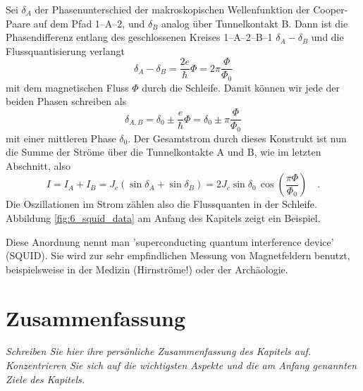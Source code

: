 Sei $\delta_A$ der Phasenunterschied der makroskopischen Wellenfunktion der Cooper-Paare auf dem Pfad 1--A--2, und $\delta_B$ analog über Tunnelkontakt B. Dann ist die Phasendifferenz entlang des geschlossenen Kreises 1--A--2--B--1 $\delta_A - \delta_B$ und die Flussquantisierung verlangt
\begin{equation}
    \delta_A - \delta_B = \frac{2e}{\hbar} \Phi = 2 \pi \frac{\Phi}{\Phi_0}
\end{equation}
mit dem magnetischen Fluss $\Phi$ durch die Schleife. Damit können wir jede der beiden Phasen schreiben als
\begin{equation}
    \delta_{A,B} = \delta_0 \pm  \frac{e}{\hbar} \Phi = \delta_0 \pm \pi \frac{\Phi}{\Phi_0}
\end{equation}
mit einer mittleren Phase $\delta_0$. Der Gesamtstrom durch dieses Konstrukt ist nun die Summe der Ströme über die Tunnelkontakte A und B, wie im letzten Abschnitt, also
\begin{equation}
    I = I_A + I_B = J_c \left( \sin \delta_A +  \sin \delta_B \right) =
     2 J_c \sin \delta_0 \,  \cos \left( \frac{\pi \Phi}{\Phi_0}  \right)  \quad .
\end{equation}
Die Oszillationen im Strom zählen also die Flussquanten in der Schleife.  Abbildung \ref{fig:6_squid_data} am Anfang des Kapitels zeigt ein Beispiel.

Diese Anordnung nennt man 'superconducting quantum interference device' (SQUID). Sie wird zur sehr empfindlichen Messung von Magnetfeldern benutzt, beispielsweise in der Medizin (Hirnströme!) oder der Archäologie.


\newpage

\section{Zusammenfassung}

\textit{Schreiben Sie hier ihre persönliche Zusammenfassung des Kapitels auf. Konzentrieren Sie sich auf die wichtigsten Aspekte und die am Anfang genannten Ziele des Kapitels.}

\vspace*{10cm}
\printbibliography[segment=\therefsegment,heading=subbibliography]
